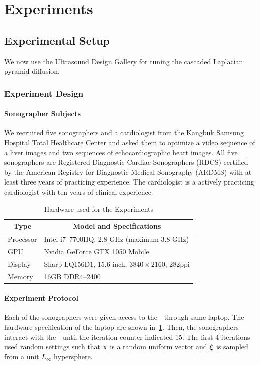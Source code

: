 
\section{Experiments}\label{section:eval}

\subsection{Experimental Setup}
We now use the Ultrasound Design Gallery for tuning the cascaded Laplacian pyramid diffusion.

\subsubsection{Experiment Design}
\paragraph{Sonographer Subjects}
We recruited five sonographers and a cardiologist from the Kangbuk Samsung Hospital Total Healthcare Center and asked them to optimize a video sequence of a liver images and two sequences of echocardiographic heart images.
All five sonographers are Registered Diagnostic Cardiac Sonographers (RDCS) certified by the American Registry for Diagnostic Medical Sonography (ARDMS) with at least three years of practicing experience.
The cardiologist is a actively practicing cardiologist with ten years of clinical experience.

\begin{table}
  \centering
  \caption{Hardware used for the Experiments}\label{table:specs}
  \begin{threeparttable}
  \begin{tabular}{ll}
    \toprule
    \multicolumn{1}{c}{\textbf{Type}}
    & \multicolumn{1}{c}{\textbf{Model and Specifications}}
    \\ \midrule
    Processor & Intel i7--7700HQ, 2.8 GHz (maximum 3.8 GHz) \\
    GPU       & Nvidia GeForce GTX 1050 Mobile \\
    Display   & Sharp LQ156D1, 15.6 inch, \(3840 \times 2160\), 282ppi  \\
    Memory    & 16GB DDR4--2400 \\ \bottomrule
  \end{tabular}
  \end{threeparttable}
\end{table}
%
\paragraph{Experiment Protocol}
Each of the sonographers were given access to the~\usdg~through same laptop.
The hardware specification of the laptop are shown in~\cref{table:specs}.
Then, the sonographers interact with the~\usdg~until the iteration counter indicated 15.
The first 4 iterations used random settings such that \(\mathbf{x}\) is a random uniform vector and \(\bm{\xi}\) is sampled from a unit \(L_{\infty}\) hypersphere.

